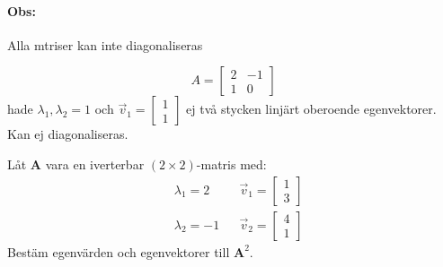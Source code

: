 \paragraph{Obs:} %
\label{par:obs_}
Alla mtriser kan inte diagonaliseras
\begin{Ex}
	\[
	A = \begin{bmatrix} 2 & -1\\1&0 \end{bmatrix}
	\]
	hade $\lambda_1, \lambda_2 = 1$ och $\vec{v}_1 = \begin{bmatrix} 1\\1 \end{bmatrix}$ ej två stycken linjärt oberoende egenvektorer. Kan ej diagonaliseras. 
\end{Ex}
\begin{Ex}
	Låt \textbf{A} vara en iverterbar $(2 \times 2)$-matris med:
	\begin{align*}
	&\lambda_1 = 2 &&\vec{v}_1 = \begin{bmatrix} 1\\3 \end{bmatrix}\\
	&\lambda_2 = -1 &&\vec{v}_2 = \begin{bmatrix} 4\\1 \end{bmatrix}
	\end{align*}
	Bestäm egenvärden och egenvektorer till $\mathbf{A}^2$.

\end{Ex}
